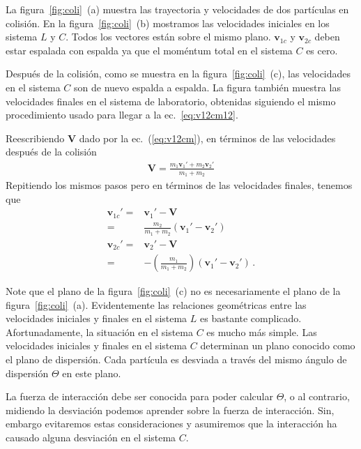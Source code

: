 La figura~\ref{fig:coli}~(a) muestra las trayectoria y velocidades de
dos partículas en colisión.  
En la figura~\ref{fig:coli}~(b) mostramos las velocidades iniciales en
los sistema $L$ y $C$.
Todos los vectores están sobre el mismo plano.
$\mathbf{v}_{1c}$ y $\mathbf{v}_{2c}$ deben estar espalada con espalda
ya que el moméntum total en el sistema $C$ es cero. 

Después de la colisión, como se muestra en la
figura~\ref{fig:coli}~(c), las velocidades en el sistema $C$ son de
nuevo espalda a espalda.
La figura también muestra las velocidades
finales en el sistema de laboratorio, obtenidas siguiendo el mismo
procedimiento usado para llegar a la ec.~\eqref{eq:v12cm12}. 

Reescribiendo
$\mathbf{V}$ dado por la ec.~(\ref{eq:v12cm}),  en términos de 
las velocidades después de la colisión
  \begin{align}
    \label{eq:Vpcm}
    \mathbf{V}=\frac{m_1\mathbf{v}_1'+m_2\mathbf{v}_2'}{m_1+m_2}
  \end{align}
Repitiendo los mismos pasos pero en términos de las velocidades
finales, tenemos que
\begin{align}
  \label{eq:v12pcm12}
  \mathbf{v}_{1c}'=&\mathbf{v}_1'-\mathbf{V}\nonumber\\
    =&\frac{m_2}{m_1+m_2}(\mathbf{v}_1'-\mathbf{v}_2')\nonumber\\
 \mathbf{v}_{2c}'= &\mathbf{v}_2'-\mathbf{V}\nonumber\\
=&-\left(\frac{m_1}{m_1+m_2} \right)\left(\mathbf{v}_1'-\mathbf{v}_2' \right)\,.
\end{align}


Note que el plano de la figura~\ref{fig:coli}~(c) no es necesariamente
el plano de la figura~\ref{fig:coli}~(a). 
Evidentemente las relaciones geométricas entre las velocidades
iniciales y finales en el sistema $L$ es bastante complicado. 
Afortunadamente, la situación en el sistema $C$ es mucho más simple. 
Las velocidades iniciales y finales en el sistema $C$ determinan un
plano conocido como el plano de dispersión. 
Cada partícula es desviada a través del mismo ángulo de dispersión
$\Theta$ en este plano.

La fuerza de interacción debe ser conocida para poder calcular
$\Theta$, o al contrario, midiendo la desviación podemos aprender
sobre la fuerza de interacción. Sin, embargo evitaremos estas
consideraciones y asumiremos que la interacción ha causado alguna
desviación en el sistema $C$.


